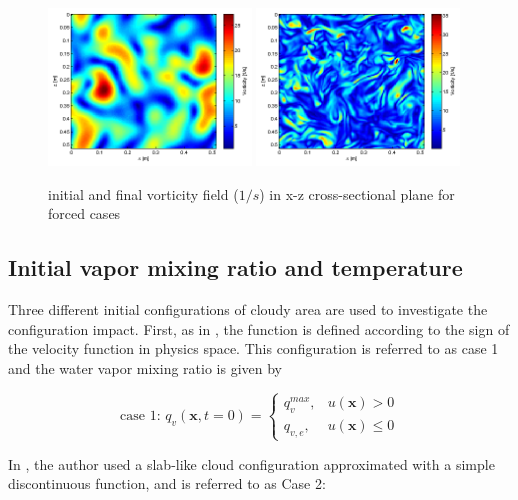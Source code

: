 \begin{figure}[h]\centering
\includegraphics[width=0.48\textwidth]{Figures/vortex-0}
\includegraphics[width=0.48\textwidth]{Figures/vortex-1}

\caption{initial and final vorticity field ($1/s$) in x-z cross-sectional
plane for forced cases\label{fig:enstrophy}}
\end{figure}

\subsection{Initial vapor mixing ratio and temperature}
Three different initial configurations of cloudy area are used to investigate
the configuration impact. First, as in \cite{And04}, the function is defined
according to the sign of the velocity function in physics space. This
configuration is referred to as case 1 and the water vapor mixing ratio is
given by

\begin{equation}
\mbox{case 1: } q_v(\mathbf{x},t=0) = 
\left\{\begin{array}{lr}
q_v^{max}, & u(\mathbf{x}) > 0\\
q_{v,e}, & u(\mathbf{x}) \le 0
\end{array}\right.\label{case1}
\end{equation}

In \cite{Kumar11}, the author used a slab-like cloud configuration approximated with a simple discontinuous function, and is referred to as Case 2:

